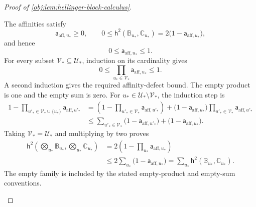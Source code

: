 \documentclass[11pt]{article}
\begin{document}
\begin{proof}[Proof of \cref{obj:lem:hellinger-block-calculus}]
\begin{enumerate}
The affinities satisfy
\[
\mathsf a_{\mathrm{aff},u_*}\ge0,
\qquad
0\le\mathsf h^2(\mathbb B_{u_*},\mathbb C_{u_*})
   =2\bigl(1-\mathsf a_{\mathrm{aff},u_*}\bigr),
\]
and hence
\[
0\le\mathsf a_{\mathrm{aff},u_*}\le1.
\]
For every subset \(\mathcal V_*\subseteq\mathcal U_*\), induction on its cardinality gives
\[
0\le\prod_{u_*\in\mathcal V_*}\mathsf a_{\mathrm{aff},u_*}\le1.
\]
A second induction gives the required affinity-defect bound. The empty product is one and the empty sum is zero. For \(u_*\in\mathcal U_*\setminus\mathcal V_*\), the induction step is
\[
\begin{aligned}
1-\prod_{u'_*\in\mathcal V_*\cup\{u_*\}}
       \mathsf a_{\mathrm{aff},u'_*}
&=
\left(1-\prod_{u'_*\in\mathcal V_*}
       \mathsf a_{\mathrm{aff},u'_*}\right)
+
\bigl(1-\mathsf a_{\mathrm{aff},u_*}\bigr)
 \prod_{u'_*\in\mathcal V_*}\mathsf a_{\mathrm{aff},u'_*}\\
&\le
\sum_{u'_*\in\mathcal V_*}
 \bigl(1-\mathsf a_{\mathrm{aff},u'_*}\bigr)
+
\bigl(1-\mathsf a_{\mathrm{aff},u_*}\bigr).
\end{aligned}
\]
Taking \(\mathcal V_*=\mathcal U_*\) and multiplying by two proves
\[
\begin{aligned}
\mathsf h^2\left(\bigotimes_{u_*}\mathbb B_{u_*},
                \bigotimes_{u_*}\mathbb C_{u_*}\right)
&=2\left(1-\prod_{u_*}\mathsf a_{\mathrm{aff},u_*}\right)\\
&\le2\sum_{u_*}\bigl(1-\mathsf a_{\mathrm{aff},u_*}\bigr)
=\sum_{u_*}\mathsf h^2(\mathbb B_{u_*},\mathbb C_{u_*}).
\end{aligned}
\]
The empty family is included by the stated empty-product and empty-sum conventions.


\end{enumerate}
\end{proof}
\end{document}

